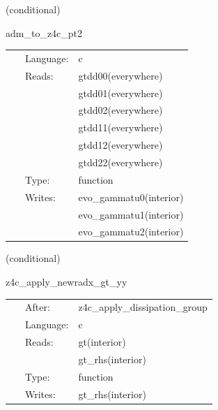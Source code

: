 \documentclass{article}
\begin{document}
\vspace{5mm}

   (conditional) 

\hspace{5mm} adm\_to\_z4c\_pt2 

\hspace{5mm}{\it function `adm\_to\_z4c\_pt2` generated by einsteinengine. } 


\hspace{5mm}

 \begin{tabular*}{160mm}{cll} 
~ & Language:  & c \\ 
~ & Reads:  & gtdd00(everywhere) \\ 
~& ~ &gtdd01(everywhere)\\ 
~& ~ &gtdd02(everywhere)\\ 
~& ~ &gtdd11(everywhere)\\ 
~& ~ &gtdd12(everywhere)\\ 
~& ~ &gtdd22(everywhere)\\ 
~ & Type:  & function \\ 
~ & Writes:  & evo\_gammatu0(interior) \\ 
~& ~ &evo\_gammatu1(interior)\\ 
~& ~ &evo\_gammatu2(interior)\\ 
\end{tabular*} 


\vspace{5mm}

   (conditional) 

\hspace{5mm} z4c\_apply\_newradx\_gt\_yy 



\hspace{5mm}

 \begin{tabular*}{160mm}{cll} 
~ & After:  & z4c\_apply\_dissipation\_group \\ 
~ & Language:  & c \\ 
~ & Reads:  & gt(interior) \\ 
~& ~ &gt\_rhs(interior)\\ 
~ & Type:  & function \\ 
~ & Writes:  & gt\_rhs(interior) \\ 
\end{tabular*} 
\end{document}
